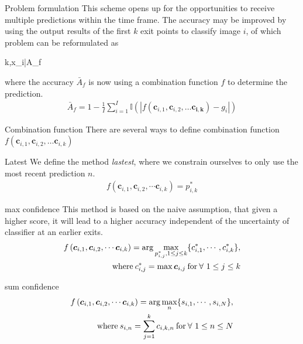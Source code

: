 \begin{enumdescript}
\begin{enumdescript}
		\end{enumdescript}
		\item[Problem formulation] 
		This scheme opens up for the opportunities to receive multiple predictions within the time frame. The accuracy may be improved by using the output results of the first $ k $ exit points to classify image $ i $, of which problem can be reformulated as
		\begin{maxi}
			{k,x_i}{\bar{A}_f}
			{}{}
		\end{maxi}
		where the accuracy $ \bar{A}_f $ is now using a combination function $ f $ to determine the prediction.
		\begin{align*}
		\bar{A}_f = 1 - \frac{1}{I} \sum_{i=1}^{I}\mathbb{I}\left(\left|f\left(\mathbf{c}_{i,1}, \mathbf{c}_{i,2}, \dots \mathbf{c_{i,k}}\right)-g_i\right|\right)
		\end{align*}
		
			\item[Combination function] There are several ways to define combination function $ f\left(\mathbf{c}_{i,1}, \mathbf{c}_{i,2}, \dots \mathbf{c}_{i,k}\right) $
		\begin{enumdescript}
		
			
				\item[Latest] We define the method \emph{lastest}, where we constrain ourselves to only use the most recent prediction $n$.
				\begin{align}
					f\left(\bm{c}_{i,1}, \bm{c}_{i,2}, \cdots \bm{c}_{i,k} \right) = p_{i,k}^{*}
				\end{align}
				
				\item[max confidence] This method is based on the naive assumption, that given a higher score, it will lead to a higher accuracy independent of the uncertainty of classifier at an earlier exits.
				\begin{align}
				\begin{split}
				f\left(\bm{c}_{i,1}, \bm{c}_{i,2}, \cdots \bm{c}_{i,k} \right) = \arg \underset{{p_{i,j}^{*}, 1 \le j 
						\le k}}{\max} \{c_{i,1}^*, \cdots, c_{i,k}^*\},\\ \text{where\:} c_{i,j}^* = \max\bm{c}_{i,j} \text{\:for\:} \forall \ 1 \le j \le k
				\end{split}	
				\end{align}
				\item[sum confidence]
				\begin{align}
				\begin{split}
				f\left(\bm{c}_{i,1}, \bm{c}_{i,2}, \cdots \bm{c}_{i,k} \right) = \arg \underset{n}{\max} \{s_{i,1}, \cdots, s_{i,N}\}, \\ \text{where\:} s_{i,n} = \sum_{j=1}^{k}c_{i,k,n} \text{\:for\:} \forall \ 1\le n \le N
				\end{split}
				\end{align}


\end{enumdescript}
\end{enumdescript}
